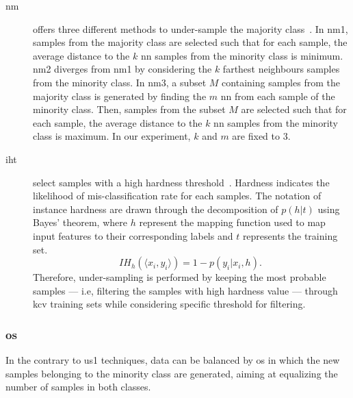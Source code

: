 \begin{description}
  \item[\Ac{nm}] offers three different methods to under-sample the majority class~\cite{mani2003knn}.
In \ac{nm1}, samples from the majority class are selected such that for each sample, the average distance to the $k$ \ac{nn} samples from the minority class is minimum.
\ac{nm2} diverges from \ac{nm1} by considering the $k$ farthest neighbours samples from the minority class.
In \ac{nm3}, a subset $M$ containing samples from the majority class is generated by finding the $m$ \ac{nn} from each sample of the minority class.
Then, samples from the subset $M$ are selected such that for each sample, the average distance to the $k$ \ac{nn} samples from the minority class is maximum.
In our experiment, $k$ and $m$ are fixed to 3.
\item[\Ac{iht}] select samples with a high hardness threshold~\cite{smith2014instance}.
Hardness indicates the likelihood of mis-classification rate for each samples.
The notation of instance hardness are drawn through the decomposition of $p(h \vert t)$ using Bayes' theorem, where $h$ represent the mapping function used to map input features to their corresponding labels and $t$ represents the training set.
\begin{equation}
  IH_h(\langle x_{i}, y_{i}\rangle) = 1 - p(y_i \vert x_i, h).\
\label{eq:iht}
\end{equation}
Therefore, under-sampling is performed by keeping the most probable samples --- i.e, filtering the samples with high hardness value --- through \ac{kcv} training sets while considering specific threshold for filtering.

 
\end{description}

\subsubsection{\Acl*{os}}
In the contrary to \ac{us1} techniques, data can be balanced by \ac{os} in which the new samples belonging to the minority class are generated, aiming at equalizing the number of samples in both classes.

